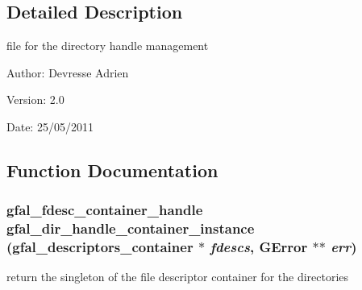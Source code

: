 \subsection{Detailed Description}
file for the directory handle management 

\begin{Desc}
\item[Author:]Devresse Adrien \end{Desc}
\begin{Desc}
\item[Version:]2.0 \end{Desc}
\begin{Desc}
\item[Date:]25/05/2011 \end{Desc}


\subsection{Function Documentation}
\subsubsection{\setlength{\rightskip}{0pt plus 5cm}gfal\_\-fdesc\_\-container\_\-handle gfal\_\-dir\_\-handle\_\-container\_\-instance (gfal\_\-descriptors\_\-container $\ast$ {\em fdescs}, GError $\ast$$\ast$ {\em err})}\label{gfal__common__dir__handle_8c_0973d623e1abd39d0830739b0710512f}


return the singleton of the file descriptor container for the directories 